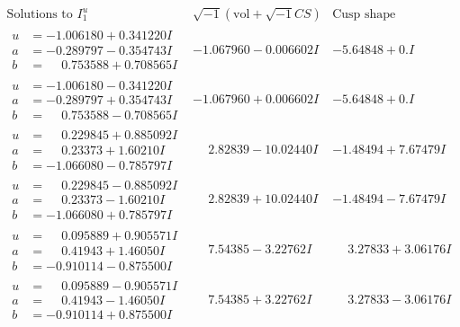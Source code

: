 \documentclass[1p]{elsarticle_modified}
\theoremstyle{definition}
\newcommand{\I}{\sqrt{-1}}
\begin{document}
$$\begin{array}{c|c|c}  
\text{Solutions to }I^u_{1}& \I (\text{vol} + \sqrt{-1}CS) & \text{Cusp shape}\\
 \hline 
\begin{aligned}
u &= -1.006180 + 0.341220 I \\
a &= -0.289797 - 0.354743 I \\
b &= \phantom{-}0.753588 + 0.708565 I\end{aligned}
 & -1.067960 - 0.006602 I & -5.64848 + 0. I\phantom{ +0.000000I} \\ \hline\begin{aligned}
u &= -1.006180 - 0.341220 I \\
a &= -0.289797 + 0.354743 I \\
b &= \phantom{-}0.753588 - 0.708565 I\end{aligned}
 & -1.067960 + 0.006602 I & -5.64848 + 0. I\phantom{ +0.000000I} \\ \hline\begin{aligned}
u &= \phantom{-}0.229845 + 0.885092 I \\
a &= \phantom{-}0.23373 + 1.60210 I \\
b &= -1.066080 - 0.785797 I\end{aligned}
 & \phantom{-}2.82839 - 10.02440 I & -1.48494 + 7.67479 I \\ \hline\begin{aligned}
u &= \phantom{-}0.229845 - 0.885092 I \\
a &= \phantom{-}0.23373 - 1.60210 I \\
b &= -1.066080 + 0.785797 I\end{aligned}
 & \phantom{-}2.82839 + 10.02440 I & -1.48494 - 7.67479 I \\ \hline\begin{aligned}
u &= \phantom{-}0.095889 + 0.905571 I \\
a &= \phantom{-}0.41943 + 1.46050 I \\
b &= -0.910114 - 0.875500 I\end{aligned}
 & \phantom{-}7.54385 - 3.22762 I & \phantom{-}3.27833 + 3.06176 I \\ \hline\begin{aligned}
u &= \phantom{-}0.095889 - 0.905571 I \\
a &= \phantom{-}0.41943 - 1.46050 I \\
b &= -0.910114 + 0.875500 I\end{aligned}
 & \phantom{-}7.54385 + 3.22762 I & \phantom{-}3.27833 - 3.06176 I \\ \hline\begin{aligned}

\end{aligned}
\end{array}$$
\end{document}
